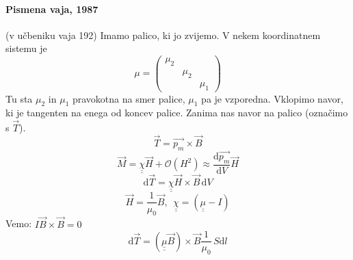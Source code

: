 \documentclass[a4paper]{article}
\newcommand{\vct}[1]{\overrightarrow{#1}}
\newcommand{\dif}{\mathrm{d}}
\newcommand{\dd}[2]{\frac{\mathrm{d} {#1}}{\mathrm{d} {#2}}}
\newcommand{\duline}[1]{\underline{\underline{#1}}}
\begin{document}
\paragraph{Pismena vaja, 1987} (v učbeniku vaja 192) Imamo palico, ki jo zvijemo. V nekem koordinatnem sistemu je
$$\mu = \begin{pmatrix}
    \mu_2&& \\
    &\mu_2& \\
    &&\mu_1
\end{pmatrix}$$
Tu sta $\mu_2$ in $\mu_1$ pravokotna na smer palice, $\mu_1$ pa je vzporedna. Vklopimo navor, ki je tangenten na enega od koncev palice. Zanima nas navor na palico (označimo s $\vct{T}$).
$$\vct{T} = \vct{p_m}\times\vct{B}$$
$$\vct{M} = \duline{\chi}\vct{H} + \mathcal{O}(H^2) \approx \dd{\vct{p_m}}{V}\vct{H}$$
$$\dif \vct{T} = \duline{\chi}\vct{H}\times\vct{B}\,\dif V$$
$$\vct{H} = \frac{1}{\mu_0}\vct{B},~~\duline{\chi} = (\duline{\mu} - I)$$
Vemo: $I\vct{B}\times\vct{B} = 0$
$$\dif\vct{T} = (\duline{\mu}\vct{B}) \times \vct{B} \frac{1}{\mu_0}\,S\dif l$$
\end{document}
